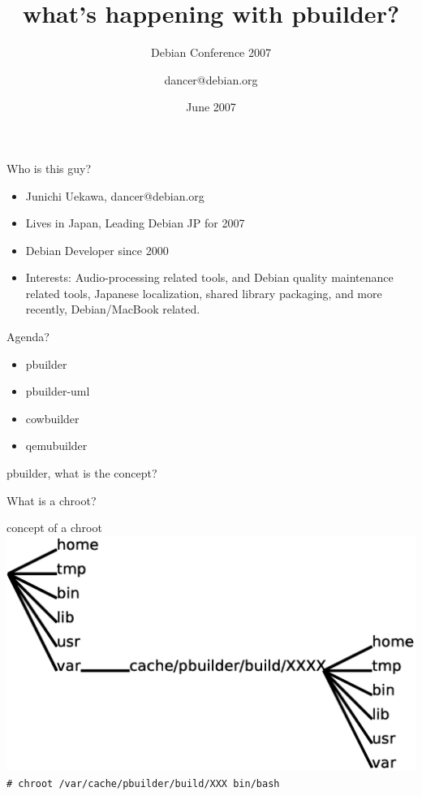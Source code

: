 \documentclass[dvipdfm,17pt,times]{beamer}
\title{what's happening with pbuilder?}
\subtitle{Debian Conference 2007}
\author{dancer@debian.org}
\date{June 2007}
\newcommand{\emtext}[1]{
\begin{frame}{}
 
{\Huge #1
}
\end{frame}
}
\begin{document}
\frame{\titlepage{}}

\begin{frame}{Who is this guy?}
\begin{itemize}
 \item Junichi Uekawa, dancer@debian.org
 \item Lives in Japan, Leading Debian JP for 2007
 \item Debian Developer since 2000
 \item Interests: Audio-processing related tools, and 
       Debian quality maintenance related tools,
       Japanese localization, shared library packaging, 
       and more recently, Debian/MacBook related.
\end{itemize}
\end{frame}

\begin{frame}{Agenda?}
\begin{itemize}
 \item pbuilder
 \item pbuilder-uml
 \item cowbuilder
 \item qemubuilder
\end{itemize}
\end{frame}

\emtext{pbuilder, what is the concept?}

\emtext{What is a chroot?}

\begin{frame}{concept of a chroot}
 \includegraphics[width=0.8\hsize]{chroot.eps}\\
\texttt{\# chroot /var/cache/pbuilder/build/XXX bin/bash}
\end{frame}
\end{document}
